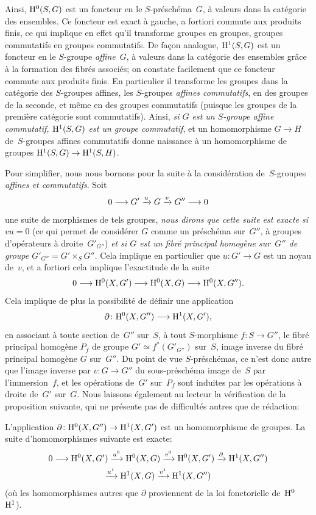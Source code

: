 Ainsi, $\mathrm{H}^0(S,G)$ est un foncteur en le $S$-pr\'esch\'ema~$G$,
\`a valeurs dans la cat\'egorie des ensembles. Ce foncteur est
exact \`a gauche, a fortiori commute aux produits finis, ce qui
implique en effet qu'il transforme groupes en groupes, groupes
commutatifs en groupes commutatifs. De fa\c con analogue,
$\mathrm{H}^1(S,G)$ est un foncteur en le $S$-groupe \emph{affine}~$G$, \`a
valeurs dans la cat\'egorie des ensembles gr\^ace \`a la
formation des fibr\'es associ\'es; on constate facilement que ce
foncteur commute aux produits finis. En particulier il transforme les
groupes dans la cat\'egorie des $S$-groupes affines, \ie les
$S$-groupes \emph{affines commutatifs}, en des groupes de la seconde,
et m\^eme en des groupes commutatifs (puisque les groupes de la
premi\`ere cat\'egorie sont commutatifs). Ainsi, \emph{si $G$ est
un $S$-groupe affine commutatif, $\mathrm{H}^1(S,G)$ est un groupe
commutatif}, et un homomorphisme $G\to H$ de~$S$-groupes affines
commutatifs donne naissance \`a un homomorphisme de groupes
$\H^1(S,G)\to\H^1(S,H)$.

Pour simplifier, nous nous bornons pour la suite \`a la
consid\'eration de~$S$-groupes \emph{affines et commutatifs}. Soit
$$
0\to G'\lto{u} G\lto{v}G''\to 0
$$
une suite de morphismes de tels groupes, \emph{nous dirons que cette
suite est exacte si $vu=0$} (ce qui permet de consid\'erer $G$
comme un pr\'esch\'ema sur~$G''$, \`a groupes d'op\'erateurs
\`a droite~$G'_{G''}$) \emph{et si $G$ est un fibré principal
homogène
sur~$G''$ de groupe $G'_{G''}=G'\times_S G''$}. Cela implique en
particulier que $u\colon G'\to G$ est un noyau de~$v$, et a fortiori
cela implique l'exactitude de la suite
$$0\to\H^0(X,G')\to\H^0(X,G)\to\H^0(X,G'').$$ Cela implique de plus la
possibilit\'e de d\'efinir une application
$$
\partial\colon\H^0(X,G'')\to\H^1(X,G')\quoi,
$$
en associant \`a toute section de~$G''$ sur~$S$, \ie \`a tout
$S$-morphisme $f\colon S\to G''$, le fibr\'e principal homog\`ene
$P_f$ de groupe $G'\simeq f^*(G'_{G''})$ sur~$S$, image inverse du
fibr\'e principal homog\`ene $G$ sur~$G''$. Du point de vue
$S$-pr\'esch\'emas, ce n'est donc autre que l'image inverse par
$v\colon G\to G''$ du sous-pr\'esch\'ema image de~$S$ par
l'immersion~$f$, et les op\'erations de~$G'$ sur~$P_f$ sont induites
par les op\'erations \`a droite de~$G'$
sur~$G$.
Nous laissons \'egalement au lecteur la v\'erification de la
proposition suivante, qui ne pr\'esente pas de difficult\'es
autres que de r\'edaction:

\begin{proposition}
\label{XI.4.5}
L'application $\partial\colon \H^0(X,G'')\to\H^1(X,G')$ est un
homomorphisme de groupes. La suite d'homomorphismes suivante est
exacte:
\begin{multline*}
0\to\H^0(X,G')\lto{u^0}\H^0(X,G)\lto{v^0}\H^0(X,G')\lto{\partial}\H^1(X,G'')\\
\lto{u^1}\H^1(X,G) \lto{v^1}\H^1(X,G'')
\end{multline*}
(o\`u les homomorphismes autres que $\partial$ proviennent de la loi
fonctorielle de~$\mathrm{H}^0$ \resp~$\mathrm{H}^1$).
\end{proposition}

